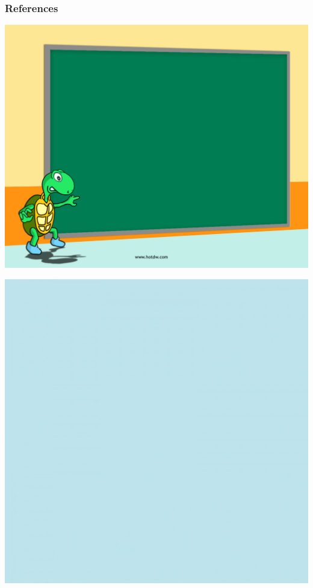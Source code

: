 \documentclass[mathserif, handout]{beamer}
\begin{document}
\begin{frame}[allowframebreaks]
  \frametitle{References}
  \scriptsize{}
  
\end{frame}

\usebackgroundtemplate
{
  \includegraphics[width=\paperwidth,height=\paperheight]{./figs/lastpage.jpg}%
}
\begin{frame}
  

  \vspace{2em}

  
\end{frame}


\usebackgroundtemplate
{
  \includegraphics[width=\paperwidth,height=\paperheight]{./figs/background.jpg}%
}
\end{document}
